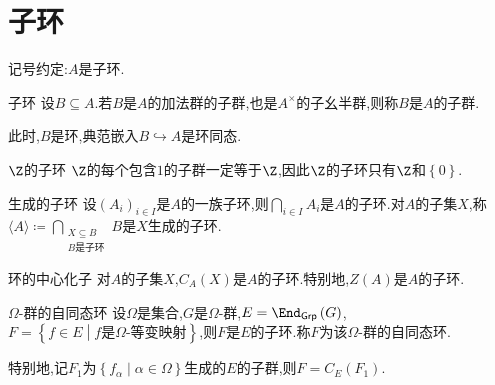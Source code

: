 \section{子环}

记号约定:$A$是子环.

\begin{definition}{子环}{}
	设$B\subseteq A$.若$B$是$A$的加法群的子群,也是$A^{\times}$的子幺半群,则称$B$是$A$的子群.
\end{definition}

\begin{remark}{}{}
	此时,$B$是环,典范嵌入$B\hookrightarrow A$是环同态.
\end{remark}

\begin{example}{$\Z$的子环}{}
	$\Z$的每个包含$1$的子群一定等于$\Z$,因此$\Z$的子环只有$\Z$和$\left\{0\right\}$.
\end{example}

\begin{example}{生成的子环}{}
	设$\left(A_{i}\right)_{i\in I}$是$A$的一族子环,则$\bigcap\limits_{i\in I}A_{i}$是$A$的子环.对$A$的子集$X$,称$\langle A\rangle\coloneq\bigcap\limits_{\substack{X\subseteq B\\ B\text{是子环}}}B$是$X$生成的子环.
\end{example}

\begin{example}{环的中心化子}{}
	对$A$的子集$X$,$C_{A}\left(X\right)$是$A$的子环.特别地,$Z\left(A\right)$是$A$的子环.
\end{example}

\begin{example}{$\Omega$-群的自同态环}{}
	设$\Omega$是集合,$G$是$\Omega$-群,$E=\End_{\mathsf{Grp}}\left(G\right)$,$F=\left\{f\in E\middle|f\text{是}\Omega\text{-等变映射}\right\}$,则$F$是$E$的子环.称$F$为该$\Omega$-群的自同态环.
	
	特别地,记$F_{1}$为$\left\{f_{\alpha}\middle|\alpha\in\Omega\right\}$生成的$E$的子群,则$F=C_{E}\left(F_{1}\right)$.
\end{example}



















